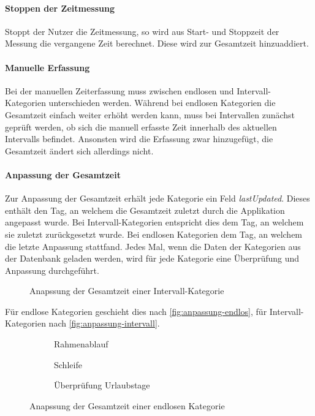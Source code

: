 \paragraph{Stoppen der Zeitmessung}
Stoppt der Nutzer die Zeitmessung,
so wird aus Start- und Stoppzeit der Messung die vergangene Zeit berechnet.
Diese wird zur Gesamtzeit hinzuaddiert.

\paragraph{Manuelle Erfassung}
Bei der manuellen Zeiterfassung muss zwischen endlosen und Intervall- Kategorien unterschieden werden.
Während bei endlosen Kategorien die Gesamtzeit einfach weiter erhöht werden kann,
muss bei Intervallen zunächst geprüft werden,
ob sich die manuell erfasste Zeit innerhalb des aktuellen Intervalls befindet.
Ansonsten wird die Erfassung zwar hinzugefügt,
die Gesamtzeit ändert sich allerdings nicht.

\paragraph{Anpassung der Gesamtzeit}
Zur Anpassung der Gesamtzeit erhält jede Kategorie ein Feld \emph{lastUpdated}.
Dieses enthält den Tag, an welchem die Gesamtzeit zuletzt durch die Applikation angepasst wurde.
Bei Intervall-Kategorien entspricht dies dem Tag, an welchem sie zuletzt zurückgesetzt wurde.
Bei endlosen Kategorien dem Tag, an welchem die letzte Anpassung stattfand.
Jedes Mal, wenn die Daten der Kategorien aus der Datenbank geladen werden,
wird für jede Kategorie eine Überprüfung und Anpassung durchgeführt.

\begin{figure}[ht!]
    \centering
    \resizebox{0.5\textwidth}{!}{
        
    }
	\caption{Anapssung der Gesamtzeit einer Intervall-Kategorie}
    \label{fig:anpassung-intervall}
\end{figure}

Für endlose Kategorien geschieht dies nach \autoref{fig:anpassung-endlos},
für Intervall-Kategorien nach \autoref{fig:anpassung-intervall}.

\begin{figure}[ht!]
    \begin{subfigure}{0.4\textwidth}
        \resizebox{0.9\linewidth}{!}{
            
        }
		\caption{Rahmenablauf}
	\end{subfigure}
	\begin{subfigure}{0.4\textwidth}
        \resizebox{0.9\linewidth}{!}{
            
        }
		\caption{Schleife}
    \end{subfigure}
    \begin{subfigure}{0.8\textwidth}
        \resizebox{\linewidth}{!}{
            
        }
		\caption{Überprüfung Urlaubstage}
	\end{subfigure}
	\caption{Anapssung der Gesamtzeit einer endlosen Kategorie}
	\label{fig:anpassung-endlos}
\end{figure}

